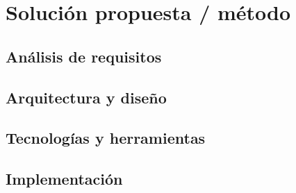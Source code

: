 \chapter{Solución propuesta / método}
\label{ch:method}


\section{Análisis de requisitos}

\section{Arquitectura y diseño}

\section{Tecnologías y herramientas}

\section{Implementación}
